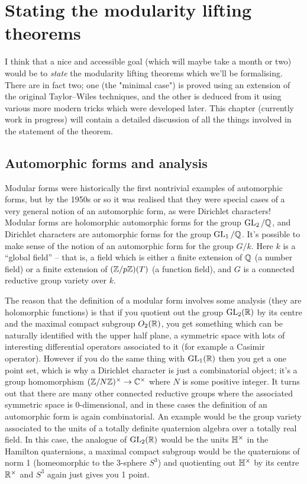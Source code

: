 \chapter{Stating the modularity lifting theorems}

I think that a nice and accessible goal (which will maybe take a month or two) would be to \emph{state} the modularity lifting theorems which we'll be formalising. There are in fact two; one (the "minimal case") is proved using an extension of the original Taylor--Wiles techniques, and the other is deduced from it using various more modern tricks which were developed later. This chapter (currently work in progress) will contain a detailed discussion of all the things involved in the statement of the theorem.

\section{Automorphic forms and analysis}

Modular forms were historically the first nontrivial examples of automorphic forms, but by the 1950s or so it was realised that they were special cases of a very general notion of an automorphic form, as were Dirichlet characters! Modular forms are holomorphic automorphic forms for the group $\operatorname{GL}_2/\mathbb{Q}$, and Dirichlet characters are automorphic forms for the group $\operatorname{GL}_1/\mathbb{Q}$. It's possible to make sense of the notion of an automorphic form for the group $G/k$. Here $k$ is a ``global field'' -- that is, a field which is either a finite extension of $\mathbb{Q}$ (a number field) or a finite extension of $(\mathbb{Z}/p\mathbb{Z})(T)$ (a function field), and $G$ is a connected reductive group variety over $k$.

The reason that the definition of a modular form involves some analysis (they are holomorphic functions) is that if you quotient out the group $\operatorname{GL}_2(\mathbb{R})$ by its centre and the maximal compact subgroup $O_2(\mathbb{R})$, you get something which can be naturally identified with the upper half plane, a symmetric space with lots of interesting differential operators associated to it (for example a Casimir operator). However if you do the same thing with $\operatorname{GL}_1(\mathbb{R})$ then you get a one point set, which is why a Dirichlet character is just a combinatorial object; it's a group homomorphism $(\mathbb{Z}/N\mathbb{Z})^\times\to\mathbb{C}^\times$ where $N$ is some positive integer. It turns out that there are many other connected reductive groups where the associated symmetric space is 0-dimensional, and in these cases the definition of an automorphic form is again combinatorial. An example would be the group variety associated to the units of a totally definite quaternion algebra over a totally real field. In this case, the analogue of $\operatorname{GL}_2(\mathbb{R})$ would be the units $\mathbb{H}^\times$ in the Hamilton quaternions, a maximal compact subgroup would be the quaternions of norm 1 (homeomorphic to the 3-sphere $S^3$) and quotienting out $\mathbb{H}^\times$ by its centre $\mathbb{R}^\times$ and $S^3$ again just gives you 1 point.

